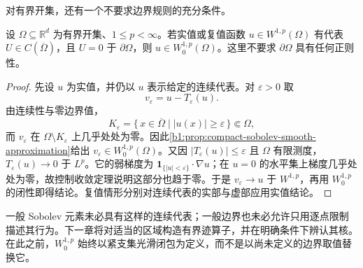 \ProseParagraphBreak

对有界开集，还有一个不要求边界规则的充分条件。

\begin{proposition}[连续零边界的充分条件]
\label{b1:prop:continuous-zero-boundary-w0}
设 \(\Omega\subseteq\mathbb R^d\) 为有界开集、\(1\le p<\infty\)。若实值或复值函数 \(u\in W^{1,p}(\Omega)\) 有代表 \(U\in C(\overline\Omega)\)，且 \(U=0\) 于 \(\partial\Omega\)，则 \(u\in W_0^{1,p}(\Omega)\)。这里不要求 \(\partial\Omega\) 具有任何正则性。
\end{proposition}
\begin{proof}
先设 \(u\) 为实值，并仍以 \(u\) 表示给定的连续代表。对 \(\varepsilon>0\) 取
\[
 v_\varepsilon=u-T_\varepsilon(u).
\]
由连续性与零边界值，
\[
 K_\varepsilon
 =\{\,x\in\overline\Omega\mid |u(x)|\ge\varepsilon\,\}
 \Subset\Omega,
\]
而 \(v_\varepsilon\) 在 \(\Omega\setminus K_\varepsilon\) 上几乎处处为零。因此\cref{b1:prop:compact-sobolev-smooth-approximation}给出 \(v_\varepsilon\in W_0^{1,p}(\Omega)\)。又因 \(|T_\varepsilon(u)|\le\varepsilon\) 且 \(\Omega\) 有限测度，\(T_\varepsilon(u)\to0\) 于 \(L^p\)。它的弱梯度为 \(\mathbf1_{\{|u|<\varepsilon\}}\cdot\nabla u\)；在 \(u=0\) 的水平集上梯度几乎处处为零，故控制收敛定理说明这部分也趋于零。于是 \(v_\varepsilon\to u\) 于 \(W^{1,p}\)，再用 \(W_0^{1,p}\) 的闭性即得结论。复值情形分别对连续代表的实部与虚部应用实值结论。
\end{proof}

一般 Sobolev 元素未必具有这样的连续代表；一般边界也未必允许只用逐点限制描述其行为。下一章将对适当的区域构造有界迹算子，并在明确条件下辨认其核。在此之前，\(W_0^{1,p}\) 始终以紧支集光滑闭包为定义，而不是以尚未定义的边界取值替换它。
